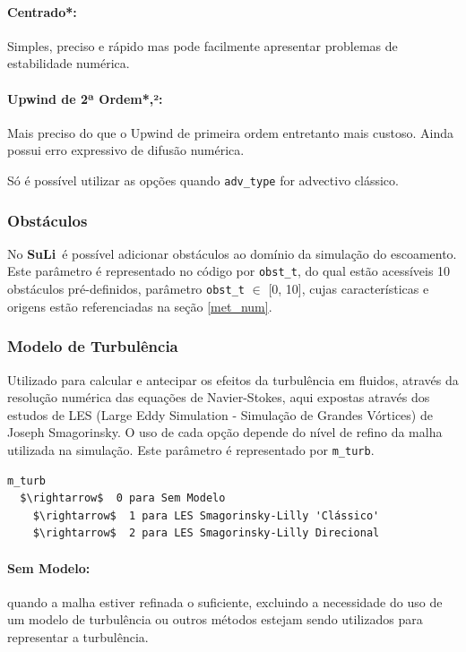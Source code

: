 \documentclass[12pt, a4paper]{article}
\newcommand{\SL}{{\bf SuLi}}
\begin{document}
\paragraph{Centrado*:} Simples, preciso e rápido mas pode facilmente apresentar problemas de estabilidade numérica.
\paragraph{Upwind de 2ª Ordem*,²:} Mais preciso do que o Upwind de primeira ordem entretanto mais custoso. Ainda possui erro expressivo de difusão numérica. 

\vspace{0.5cm}
\noindent *Só é possível utilizar as opções quando \verb|adv_type| for advectivo clássico.

\subsubsection{Obstáculos} \label{obst}
No \SL\ é possível adicionar obstáculos ao domínio da simulação do escoamento. Este parâmetro é representado no código por \verb|obst_t|, do qual estão acessíveis 10 obstáculos pré-definidos, parâmetro \verb|obst_t| $\in$ [0, 10], cujas características e origens estão referenciadas na seção \ref{met_num}.

\subsubsection{Modelo de Turbulência}
Utilizado para calcular e antecipar os efeitos da turbulência em fluidos, através da resolução numérica das equações de Navier-Stokes, aqui expostas através dos estudos de LES (Large Eddy Simulation - Simulação de Grandes Vórtices) de Joseph Smagorinsky. O uso de cada opção depende do nível de refino da malha utilizada na simulação. Este parâmetro é representado por \verb|m_turb|.
\begin{lstlisting}[escapeinside='']
m_turb  
  $\rightarrow$  0 para Sem Modelo
	$\rightarrow$  1 para LES Smagorinsky-Lilly 'Clássico'
	$\rightarrow$  2 para LES Smagorinsky-Lilly Direcional
\end{lstlisting}

\paragraph{Sem Modelo:} quando a malha estiver refinada o suficiente, excluindo a necessidade do uso de um modelo de turbulência ou outros métodos estejam sendo utilizados para representar a turbulência.
\end{document}
